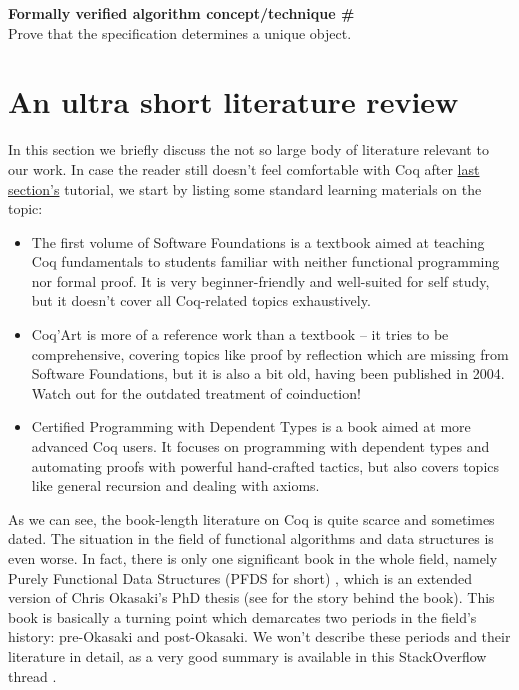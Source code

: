\documentclass[declaration,mgr,english,shortabstract]{iithesis}
\newcounter{cnt}
\newcommand{\runcnt}{\#\arabic{cnt}}
\newcommand{\concept}[1]
{
    \refstepcounter{cnt}
    \begin{center}
        \textbf{Formally verified algorithm concept/technique \runcnt} \\
        #1
    \end{center}
}
\begin{document}
\concept{Prove that the specification determines a unique object.}

\section{An ultra short literature review} \label{literature}

In this section we briefly discuss the not so large body of literature relevant to our work. In case the reader still doesn't feel comfortable with Coq after \hyperref[coq]{last section's} tutorial, we start by listing some standard learning materials on the topic:

\begin{itemize}
    \item The first volume of Software Foundations \cite{SoftwareFoundations} is a textbook aimed at teaching Coq fundamentals to students familiar with neither functional programming nor formal proof. It is very beginner-friendly and well-suited for self study, but it doesn't cover all Coq-related topics exhaustively.
    \item Coq'Art \cite{CoqArt} is more of a reference work than a textbook -- it tries to be comprehensive, covering topics like proof by reflection which are missing from Software Foundations, but it is also a bit old, having been published in 2004. Watch out for the outdated treatment of coinduction!
    \item Certified Programming with Dependent Types \cite{CPDT} is a book aimed at more advanced Coq users. It focuses on programming with dependent types and automating proofs with powerful hand-crafted tactics, but also covers topics like general recursion and dealing with axioms.
\end{itemize}

As we can see, the book-length literature on Coq is quite scarce and sometimes dated. The situation in the field of functional algorithms and data structures is even worse. In fact, there is only one significant book in the whole field, namely Purely Functional Data Structures (PFDS for short) \cite{Okasaki}, which is an extended version of Chris Okasaki's PhD thesis \cite{OkasakiPhD} (see \cite{Okasaki10YearsLater} for the story behind the book). This book is basically a turning point which demarcates two periods in the field's history: pre-Okasaki and post-Okasaki. We won't describe these periods and their literature in detail, as a very good summary is available in this StackOverflow thread \cite{SinceOkasaki}.
\end{document}
